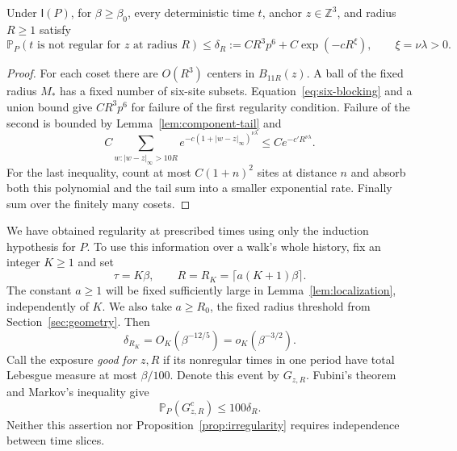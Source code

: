 \begin{proposition}\label{prop:irregularity}
Under \(\mathsf I(P)\), for \(\beta\ge\beta_0\), every
deterministic time \(t\), anchor \(z\in\mathbb Z^3\), and
radius \(R\ge1\) satisfy
\begin{equation}\label{eq:irregularity}
 \mathbb P_P(t\text{ is not regular for }z\text{ at radius }R)
 \le\delta_R:=CR^3p^6+C\exp(-cR^\xi),
 \qquad \xi=\nu\lambda>0.
\end{equation}
\end{proposition}

\begin{proof}
For each coset there are \(O(R^3)\) centers in \(B_{11R}(z)\).
A ball of the fixed radius \(M_*\) has a fixed number of six-site
subsets.  Equation~\eqref{eq:six-blocking} and a union bound give
\(CR^3p^6\) for failure of the first regularity condition.  Failure
of the second is bounded by Lemma~\ref{lem:component-tail} and
\[
 C\sum_{w:|w-z|_\infty>10R}
  e^{-c(1+|w-z|_\infty)^{\nu\lambda}}
 \le C e^{-c'R^{\nu\lambda}}.
\]
For the last inequality, count at most \(C(1+n)^2\) sites at
distance \(n\) and absorb both this polynomial and the tail sum
into a smaller exponential rate.  Finally sum over the finitely
many cosets.
\end{proof}

We have obtained regularity at prescribed times using only the
induction hypothesis for \(P\).  To use this information over a
walk's whole history, fix an integer \(K\ge1\) and set
\begin{equation}\label{eq:scales}
 \tau=K\beta,\qquad R=R_K=\lceil a(K+1)\beta\rceil.
\end{equation}
The constant \(a\ge1\) will be fixed sufficiently large in
Lemma~\ref{lem:localization}, independently of \(K\).  We also
take \(a\ge R_0\), the fixed radius threshold from
Section~\ref{sec:geometry}.  Then
\begin{equation}\label{eq:irregularity-scale}
 \delta_{R_K}=O_K(\beta^{-12/5})=o_K(\beta^{-3/2}).
\end{equation}
Call the exposure \emph{good for \(z,R\)} if its nonregular times
in one period have total Lebesgue measure at most \(\beta/100\).
Denote this event by \(G_{z,R}\).  Fubini's theorem and Markov's
inequality give
\begin{equation}\label{eq:good-exposure}
 \mathbb P_P(G_{z,R}^c)\le100\delta_R.
\end{equation}
Neither this assertion nor Proposition~\ref{prop:irregularity}
requires independence between time slices.

